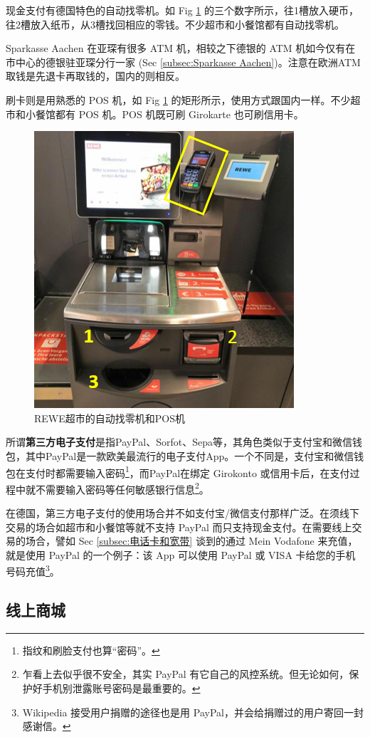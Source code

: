     现金支付有德国特色的自动找零机。如 Fig \ref{fig:REWE超市的自动找零机和POS机} 的三个数字所示，往1槽放入硬币，往2槽放入纸币，从3槽找回相应的零钱。不少超市和小餐馆都有自动找零机。

    Sparkasse Aachen 在亚琛有很多 ATM 机，相较之下德银的 ATM 机如今仅有在市中心的德银驻亚琛分行一家 (Sec \ref{subsec:Sparkasse Aachen})。注意在欧洲ATM取钱是先退卡再取钱的，国内的则相反。

    刷卡则是用熟悉的 POS 机，如 Fig \ref{fig:REWE超市的自动找零机和POS机} 的矩形所示，使用方式跟国内一样。不少超市和小餐馆都有 POS 机。POS 机既可刷 Girokarte 也可刷信用卡。

    \begin{figure}[ht]
      \centering
      \includegraphics[width=.4\textwidth]{在亚琛学习和生活/日常消费和饮食/REWE超市的自动找零机和POS机.png}
      \caption{REWE超市的自动找零机和POS机}
      \label{fig:REWE超市的自动找零机和POS机}
    \end{figure}

    所谓\textbf{第三方电子支付}是指PayPal、Sorfot、Sepa等，其角色类似于支付宝和微信钱包，其中PayPal是一款欧美最流行的电子支付App。一个不同是，支付宝和微信钱包在支付时都需要输入密码\footnote{指纹和刷脸支付也算``密码''。}，而PayPal在绑定 Girokonto 或信用卡后，在支付过程中就不需要输入密码等任何敏感银行信息\footnote{乍看上去似乎很不安全，其实 PayPal 有它自己的风控系统。但无论如何，保护好手机别泄露账号密码是最重要的。}。

    在德国，第三方电子支付的使用场合并不如支付宝/微信支付那样广泛。在须线下交易的场合如超市和小餐馆等就不支持 PayPal 而只支持现金支付。在需要线上交易的场合，譬如 Sec \ref{subsec:电话卡和宽带} 谈到的通过 Mein Vodafone 来充值，就是使用 PayPal 的一个例子：该 App 可以使用 PayPal 或 VISA 卡给您的手机号码充值\footnote{Wikipedia 接受用户捐赠的途径也是用 PayPal，并会给捐赠过的用户寄回一封感谢信。}。

  \subsection{线上商城}\label{subsec:线上商城}


